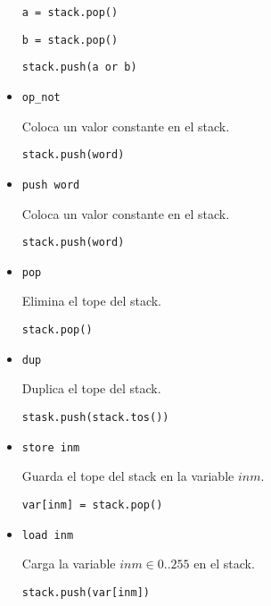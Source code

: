 \begin{itemize}
  \texttt{a = stack.pop()}

  \texttt{b = stack.pop()}

  \texttt{stack.push(a or b)}

\item \texttt{op\_not}

  Coloca un valor constante en el stack.

  \texttt{stack.push(word)}

\item \texttt{push word}

  Coloca un valor constante en el stack.

  \texttt{stack.push(word)}

\item \texttt{pop}

  Elimina el tope del stack.

  \texttt{stack.pop()}

\item \texttt{dup}

  Duplica el tope del stack.

  \texttt{stask.push(stack.tos())}

\item \texttt{store inm}

  Guarda el tope del stack en la variable $inm$.

  \texttt{var[inm] = stack.pop()}

\item \texttt{load inm}

  Carga la variable $inm \in {0..255}$ en el stack.

  \texttt{stack.push(var[inm])}

\end{itemize}

